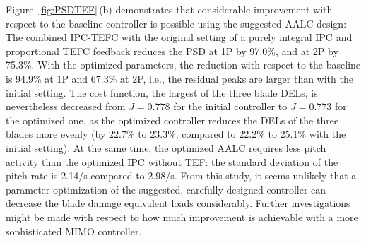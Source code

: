 Figure~\ref{fig:PSDTEF}\,(b) demonstrates that considerable improvement with respect to the baseline controller is possible using the suggested AALC design: The combined IPC-TEFC with the original setting of a purely integral IPC and proportional TEFC feedback reduces the PSD at 1P by 97.0\%, and at 2P by 75.3\%. With the optimized parameters, the reduction with respect to the baseline is 94.9\% at 1P and 67.3\% at 2P, i.e., the residual peaks are larger than with the initial setting. The cost function, the largest of the three blade DELs, is nevertheless decreased from $J = 0.778$ for the initial controller to $J = 0.773$ for the optimized one, as the optimized controller reduces the DELs of the three blades more evenly (by 22.7\% to 23.3\%, compared to 22.2\% to 25.1\% with the initial setting). At the same time, the optimized AALC requires less pitch activity than the optimized IPC without TEF: the standard deviation of the pitch rate is 2.14\textdegree/s compared to 2.98\textdegree/s.
From this study, it seems unlikely that a parameter optimization of the suggested, carefully designed controller can decrease the blade damage equivalent loads considerably. Further investigations might be made with respect to how much improvement is achievable with a more sophisticated MIMO controller.

